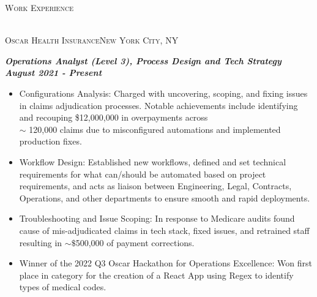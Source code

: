 \documentclass[a4paper]{article}
\newcommand{\lineunder} {
    \vspace*{-8pt} \\
    \hspace*{-18pt} \hrulefill \\
}
\newcommand{\header} [1] {
    {\hspace*{-18pt}\vspace*{6pt} \textsc{#1}}
    \vspace*{-6pt} \lineunder
}
\newcommand{\jobtitle} [1] {
    {\hspace*{-18pt} \textsc{#1}}
    
}
\begin{document}
\header{Work Experience}
\vspace{1mm}
\jobtitle{Oscar Health Insurance\hfill New York City, NY}
\hspace*{-16pt}\textit{\textbf{Operations Analyst (Level 3), Process Design and Tech Strategy}} \hfill \textit{\textbf{August 2021 - Present}}\\
\vspace{-1mm}
\begin{itemize}[leftmargin=10pt,align=left]
    \item Configurations Analysis: Charged with uncovering, scoping, and fixing issues in claims adjudication processes. 
        Notable achievements include identifying and recouping \$12,000,000 in overpayments across\\
        $\sim$ 120,000 claims due to misconfigured automations and implemented production fixes.

    \item   Workflow Design: Established new workflows, defined and set technical requirements for what can/should be automated based on project requirements,
     and acts as liaison between Engineering, Legal, Contracts, Operations, and other departments to ensure smooth and rapid deployments.
     \item 	Troubleshooting and Issue Scoping: In response to Medicare audits found cause of mis-adjudicated claims in tech stack, fixed issues, and retrained staff
     resulting in $\sim \$$500,000 of payment corrections.

     \item Winner of the 2022 Q3 Oscar Hackathon for Operations Excellence: Won first place in category for the creation of a React App using Regex to identify types of medical codes.
\end{itemize}
\end{document}
